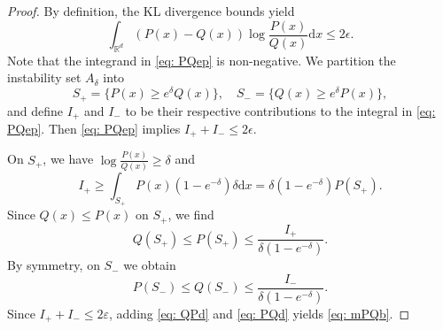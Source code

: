 \documentclass[10pt,a4paper]{amsart}
\newcommand{\D}{\mathrm{d}}
\newcommand{\Ge}{\geqslant}
\newcommand{\Le}{\leqslant}
\newcommand{\ep}{\varepsilon}
\begin{document}
\begin{proof}
By definition, the KL divergence bounds yield
\begin{equation}
\int_{\mathbb R^d} (P(x) - Q(x))\log\frac{P(x)}{Q(x)} \D x \Le 2\epsilon.
\label{eq: PQep}
\end{equation}
Note that the integrand in \eqref{eq: PQep} is non-negative. We partition the instability set $A_\delta$ into
\begin{equation*}
	S_+ = \{P(x) \Ge e^\delta Q(x)\}, \quad S_- = \{Q(x) \Ge e^\delta P(x)\},
\end{equation*}
and define $I_+$ and $I_-$ to be their respective contributions to the integral in \eqref{eq: PQep}. Then \eqref{eq: PQep} implies $I_++I_-\Le 2\epsilon$.

On $S_+$, we have $\log\frac{P(x)}{Q(x)} \Ge \delta$ and
\begin{equation*}
	I_+ \Ge \int_{S_+} P(x)(1-e^{-\delta})\delta \D x = \delta(1-e^{-\delta})P(S_+).
\end{equation*}
Since $Q(x) \Le P(x)$ on $S_+$, we find
\begin{equation}
	Q(S_+) \Le P(S_+) \Le \frac{I_+}{\delta(1-e^{-\delta})}.
	\label{eq: QPd}
\end{equation}
By symmetry, on $S_-$ we obtain
\begin{equation}
	P(S_-) \Le Q(S_-) \Le \frac{I_-}{\delta(1-e^{-\delta})}.
	\label{eq: PQd}
\end{equation}
Since $I_++I_-\Le 2\ep$, adding \eqref{eq: QPd} and \eqref{eq: PQd} yields \eqref{eq: mPQb}.
\end{proof}
\end{document}
